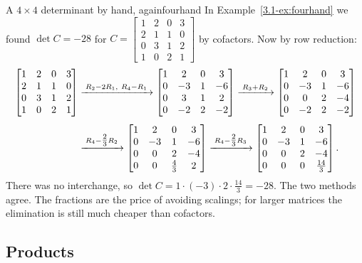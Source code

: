 \documentclass[11pt]{article}
\begin{document}
\begin{exmp}{A $4\times4$ determinant by hand, again}{fourhand}
In Example~\ref{3.1-ex:fourhand} we found $\det C=-28$ for $C=\begin{bmatrix}1&2&0&3\\2&1&1&0\\0&3&1&2\\1&0&2&1\end{bmatrix}$ by cofactors. Now by row reduction:
\begin{align*}
\begin{bmatrix}1&2&0&3\\2&1&1&0\\0&3&1&2\\1&0&2&1\end{bmatrix}
&\xrightarrow{\;R_2-2R_1,\ R_4-R_1\;}
\begin{bmatrix}1&2&0&3\\0&-3&1&-6\\0&3&1&2\\0&-2&2&-2\end{bmatrix}
\xrightarrow{\;R_3+R_2\;}
\begin{bmatrix}1&2&0&3\\0&-3&1&-6\\0&0&2&-4\\0&-2&2&-2\end{bmatrix}\\[4pt]
&\xrightarrow{\;R_4-\tfrac23R_2\;}
\begin{bmatrix}1&2&0&3\\0&-3&1&-6\\0&0&2&-4\\0&0&\tfrac43&2\end{bmatrix}
\xrightarrow{\;R_4-\tfrac23R_3\;}
\begin{bmatrix}1&2&0&3\\0&-3&1&-6\\0&0&2&-4\\0&0&0&\tfrac{14}{3}\end{bmatrix}.
\end{align*}
There was no interchange, so $\det C=1\cdot(-3)\cdot2\cdot\tfrac{14}{3}=-28$. The two methods agree. The fractions are the price of avoiding scalings; for larger matrices the elimination is still much cheaper than cofactors.
\end{exmp}

\subsection*{Products}
\end{document}
